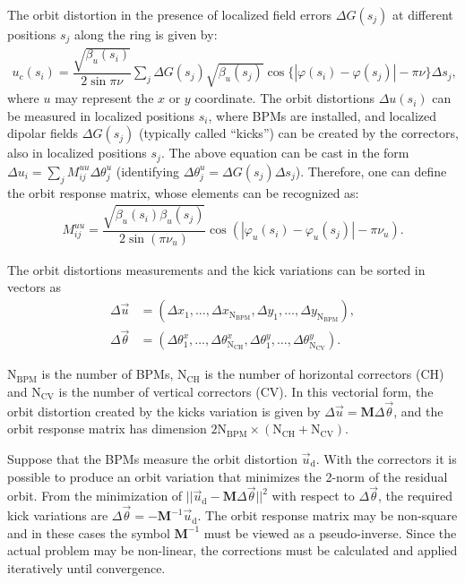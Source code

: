 \documentclass[../sands-adaptation.tex]{subfiles}
\begin{document}
 The orbit distortion in the presence of localized field errors $\Delta G(s_j)$ at different positions $s_j$ along the ring is given by:
	\begin{align*}
		u_c(s_i) = \dfrac{\sqrt{\beta_u(s_i)}}{2\sin\pi\nu} \sum_j \Delta G({s}_j) \sqrt{\beta_u({s}_j)}\cos\{ |\varphi(s_i) - \varphi({s}_j)| - \pi\nu \} \Delta s_j,
	\end{align*}
	where $u$ may represent the $x$ or $y$ coordinate.  The orbit distortions $\Delta u(s_i)$ can be measured in localized positions $s_i$, where BPMs are installed, and localized dipolar fields $\Delta G(s_j)$ (typically called ``kicks'') can be created by the correctors, also in localized positions $s_j$. The above equation can be cast in the form $\Delta u_i = \sum_{j} M_{ij}^{uu} \Delta \theta_{j}^u$ (identifying $\Delta \theta_{j}^u = \Delta G(s_j) \Delta s_j$). Therefore, one can define the orbit response matrix, whose elements can be recognized as:
 \begin{align}
 M_{ij}^{uu} = \dfrac{\sqrt{\beta_{u}(s_i)\beta_{u}(s_j)}}{2\sin\left(\pi\nu_{u}\right)}\cos\left( |\varphi_{u}(s_i) - \varphi_{u}(s_j)| - \pi\nu_{u} \right).
 \end{align}

 The orbit distortions measurements and the kick variations can be sorted in vectors as
 \begin{align*}
	 \Delta \vec{u} &= \left(\Delta x_1, \ldots, \Delta x_{\mathrm{N}_{\mathrm{BPM}}}, \Delta y_1, \ldots, \Delta y_{\mathrm{N}_{\mathrm{BPM}}}\right), \\
	 \Delta \vec{\theta} &= \left(\Delta \theta_1^x, \ldots, \Delta \theta_{\mathrm{N}_{\mathrm{CH}}}^x, \Delta \theta_1^y, \ldots, \Delta \theta_{\mathrm{N}_{\mathrm{CV}}}^y\right).
 \end{align*}

 $\mathrm{N}_{\mathrm{BPM}}$ is the number of BPMs, $\mathrm{N}_{\mathrm{CH}}$ is the number of horizontal correctors (CH) and $\mathrm{N}_{\mathrm{CV}}$ is the number of vertical correctors (CV). In this vectorial form, the orbit distortion created by the kicks variation is given by $\Delta \vec{u} = \mathbf{M} \Delta \vec{\theta}$, and the orbit response matrix has dimension $2 \mathrm{N}_{\mathrm{BPM}} \times \left(\mathrm{N}_{\mathrm{CH}} + \mathrm{N}_{\mathrm{CV}}\right)$.

 Suppose that the BPMs measure the orbit distortion $\vec{u}_{\mathrm{d}}$. With the correctors it is possible to produce an orbit variation that minimizes the 2-norm of the residual orbit. From the minimization of $||\vec{u}_{\mathrm{d}} - \mathbf{M}\Delta \vec{\theta}||^2$ with respect to $\Delta\vec{\theta}$, the required kick variations are $\Delta \vec{\theta} = -\mathbf{M}^{-1}\vec{u}_{\mathrm{d}}$. The orbit response matrix may be non-square and in these cases the symbol $\mathbf{M}^{-1}$ must be viewed as a pseudo-inverse. Since the actual problem may be non-linear, the corrections must be calculated and applied iteratively until convergence.
\end{document}
